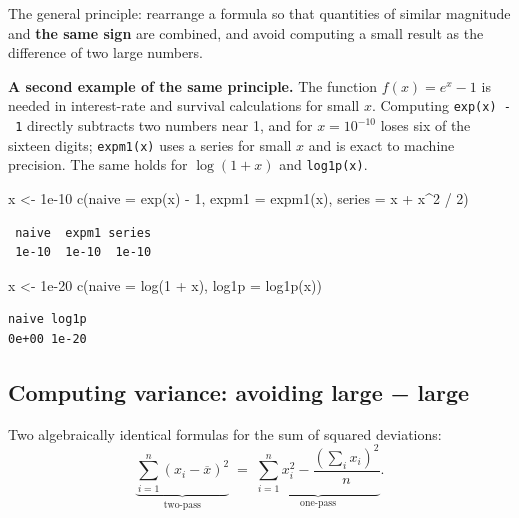 \documentclass[
  letterpaper,
  DIV=11,
  numbers=noendperiod]{scrreprt}
\newenvironment{Shaded}{\begin{snugshade}}{\end{snugshade}}
\newcommand{\AttributeTok}[1]{\textcolor[rgb]{0.40,0.45,0.13}{#1}}
\newcommand{\DecValTok}[1]{\textcolor[rgb]{0.68,0.00,0.00}{#1}}
\newcommand{\FloatTok}[1]{\textcolor[rgb]{0.68,0.00,0.00}{#1}}
\newcommand{\FunctionTok}[1]{\textcolor[rgb]{0.28,0.35,0.67}{#1}}
\newcommand{\NormalTok}[1]{\textcolor[rgb]{0.00,0.23,0.31}{#1}}
\newcommand{\OtherTok}[1]{\textcolor[rgb]{0.00,0.23,0.31}{#1}}
\newcommand{\SpecialCharTok}[1]{\textcolor[rgb]{0.37,0.37,0.37}{#1}}
\begin{document}
The general principle: rearrange a formula so that quantities of similar
magnitude and \textbf{the same sign} are combined, and avoid computing a
small result as the difference of two large numbers.

\textbf{A second example of the same principle.} The function
\(f(x) = e^x - 1\) is needed in interest-rate and survival calculations
for small \(x\). Computing \texttt{exp(x)\ -\ 1} directly subtracts two
numbers near 1, and for \(x = 10^{-10}\) loses six of the sixteen
digits; \texttt{expm1(x)} uses a series for small \(x\) and is exact to
machine precision. The same holds for \(\log(1+x)\) and
\texttt{log1p(x)}.

\begin{Shaded}
\begin{Highlighting}[]
\NormalTok{x }\OtherTok{\textless{}{-}} \FloatTok{1e{-}10}
\FunctionTok{c}\NormalTok{(}\AttributeTok{naive =} \FunctionTok{exp}\NormalTok{(x) }\SpecialCharTok{{-}} \DecValTok{1}\NormalTok{, }\AttributeTok{expm1 =} \FunctionTok{expm1}\NormalTok{(x), }\AttributeTok{series =}\NormalTok{ x }\SpecialCharTok{+}\NormalTok{ x}\SpecialCharTok{\^{}}\DecValTok{2} \SpecialCharTok{/} \DecValTok{2}\NormalTok{)}
\end{Highlighting}
\end{Shaded}

\begin{verbatim}
 naive  expm1 series 
 1e-10  1e-10  1e-10 
\end{verbatim}

\begin{Shaded}
\begin{Highlighting}[]
\NormalTok{x }\OtherTok{\textless{}{-}} \FloatTok{1e{-}20}
\FunctionTok{c}\NormalTok{(}\AttributeTok{naive =} \FunctionTok{log}\NormalTok{(}\DecValTok{1} \SpecialCharTok{+}\NormalTok{ x), }\AttributeTok{log1p =} \FunctionTok{log1p}\NormalTok{(x))}
\end{Highlighting}
\end{Shaded}

\begin{verbatim}
naive log1p 
0e+00 1e-20 
\end{verbatim}

\subsection{Computing variance: avoiding large −
large}\label{computing-variance-avoiding-large-large}

Two algebraically identical formulas for the sum of squared deviations:
\[
\underbrace{\sum_{i=1}^{n}(x_i - \overline{x})^2}_{\text{two-pass}}
\;=\;
\underbrace{\sum_{i=1}^{n} x_i^2 - \frac{\left(\sum_i x_i\right)^2}{n}}_{\text{one-pass}}.
\]
\end{document}
